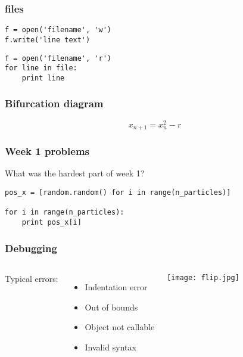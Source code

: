 \documentclass{beamer}
\begin{document}
\begin{frame}[fragile]

    \frametitle{files}

\begin{lstlisting}
f = open('filename', 'w')
f.write('line text')
\end{lstlisting}

\begin{lstlisting}
f = open('filename', 'r')
for line in file:
    print line
\end{lstlisting}

\end{frame}


\begin{frame}[fragile]

    \frametitle{Bifurcation diagram}

    \begin{equation*}
        x_{n+1} = x_n^2 - r
    \end{equation*}

\end{frame}


\begin{frame}[fragile]

    \frametitle{Week 1 problems}

    What was the hardest part of week 1?\\

    \bigskip

\begin{lstlisting}
pos_x = [random.random() for i in range(n_particles)]

for i in range(n_particles):
    print pos_x[i]

\end{lstlisting}


\end{frame}




\begin{frame}[fragile]

    \frametitle{Debugging}


    \begin{columns}[t]


    Typical errors:

    \begin{itemize}
        \item Indentation error
        \item Out of bounds
        \item Object not callable
        \item Invalid syntax
    \end{itemize}


        
            \texttt{[image: flip.jpg]}

    \end{columns}


\end{frame}
\end{document}
